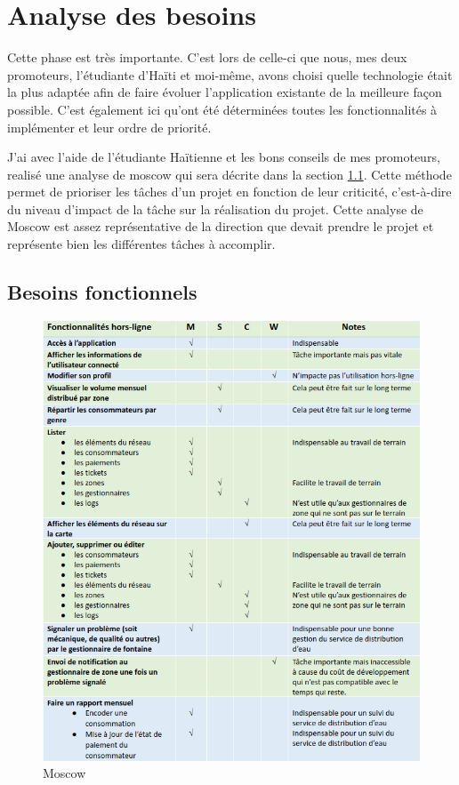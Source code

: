 \documentclass{EPL-master-thesis-covers-FR}
\begin{document}
			
			
			
			

	\chapter{Analyse des besoins}
		\label{sec:analyse_besoins}
		Cette phase est très importante. C'est lors de celle-ci que nous, mes deux promoteurs, l'étudiante d'Haïti et moi-même, avons choisi quelle technologie était la plus adaptée afin de faire évoluer l'application existante de la meilleure façon possible. C'est également ici qu'ont été déterminées toutes les fonctionnalités à implémenter et leur ordre de priorité.
		
		J'ai avec l'aide de l'étudiante Haïtienne et les bons conseils de mes promoteurs, realisé une analyse de moscow qui sera décrite dans la section \ref{sec:besoins_fonctionnels}. Cette méthode permet de prioriser les tâches d'un projet en fonction de leur criticité, c'est-à-dire du niveau d'impact de la tâche sur la réalisation du projet.
		Cette analyse de Moscow est assez représentative de la direction que devait prendre le projet et représente bien les différentes tâches à accomplir.


		\section{Besoins fonctionnels}
			\label{sec:besoins_fonctionnels}	
				
			\begin{figure}[H]
				\centering
				\includegraphics[width=1\textwidth]{images/moscow}
				\caption{Moscow}
				\label{fig:moscow}
			\end{figure}
			
\end{document}

